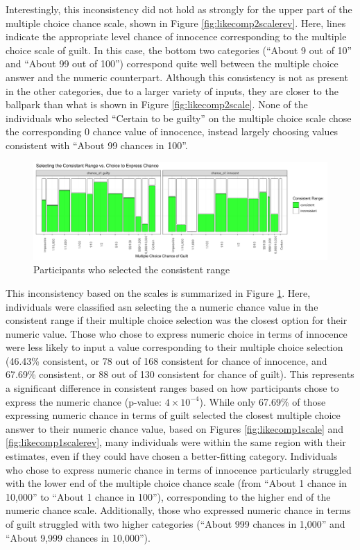 \documentclass[print]{nuthesis}
\begin{document}
Interestingly, this inconsistency did not hold as strongly for the upper part of the multiple choice chance scale, shown in Figure \ref{fig:likecomp2scalerev}.
Here, lines indicate the appropriate level chance of innocence corresponding to the multiple choice scale of guilt.
In this case, the bottom two categories (``About 9 out of 10'' and ``About 99 out of 100'') correspond quite well between the multiple choice answer and the numeric counterpart.
Although this consistency is not as present in the other categories, due to a larger variety of inputs, they are closer to the ballpark than what is shown in Figure \ref{fig:likecomp2scale}.
None of the individuals who selected ``Certain to be guilty'' on the multiple choice scale chose the corresponding 0 chance value of innocence, instead largely choosing values consistent with ``About 99 chances in 100''.

\begin{figure}

{\centering \includegraphics[width=\linewidth]{thesis_files/figure-latex/correctrangemosaic-1} 

}

\caption{Participants who selected the consistent range}\label{fig:correctrangemosaic}
\end{figure}

This inconsistency based on the scales is summarized in Figure \ref{fig:correctrangemosaic}.
Here, individuals were classified asn selecting the a numeric chance value in the consistent range if their multiple choice selection was the closest option for their numeric value.
Those who chose to express numeric choice in terms of innocence were less likely to input a value corresponding to their multiple choice selection (46.43\% consistent, or 78 out of 168 consistent for chance of innocence, and 67.69\% consistent, or 88 out of 130 consistent for chance of guilt).
This represents a significant difference in consistent ranges based on how participants chose to express the numeric chance (p-value: \ensuremath{4\times 10^{-4}}).
While only 67.69\% of those expressing numeric chance in terms of guilt selected the closest multiple choice answer to their numeric chance value, based on Figures \ref{fig:likecomp1scale} and \ref{fig:likecomp1scalerev}, many individuals were within the same region with their estimates, even if they could have chosen a better-fitting category.
Individuals who chose to express numeric chance in terms of innocence particularly struggled with the lower end of the multiple choice chance scale (from ``About 1 chance in 10,000'' to ``About 1 chance in 100''), corresponding to the higher end of the numeric chance scale.
Additionally, those who expressed numeric chance in terms of guilt struggled with two higher categories (``About 999 chances in 1,000'' and ``About 9,999 chances in 10,000'').
\end{document}
